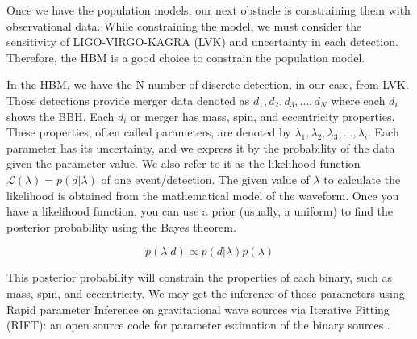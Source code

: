 \documentclass[twocolumn,prd,nofootinbib]{revtex4}
\begin{document}
Once we have the population models, our next obstacle is constraining them with observational data. While constraining the model, we must consider the sensitivity of LIGO-VIRGO-KAGRA (LVK) and uncertainty in each detection. Therefore, the HBM is a good choice to constrain the population model.

In the HBM, we have the N number of discrete detection, in our case, from LVK. Those detections provide merger data denoted as $d_1,d_2,d_3,...,d_N$ where each $d_i$ shows the BBH. Each $d_i$ or merger has mass, spin, and eccentricity properties. These properties, often called parameters, are denoted by $\lambda_1,\lambda_2,\lambda_3,...,\lambda_i$. Each parameter has its uncertainty, and we express it by the probability of the data given the parameter value. We also refer to it as the likelihood function $\mathcal{L}(\lambda)=p(d|\lambda)$ of one event/detection. The given value of $\lambda$ to calculate the likelihood is obtained from the mathematical model of the waveform. Once you have a likelihood function, you can use a prior (usually, a uniform) to find the posterior probability using the Bayes theorem.

\begin{equation}
\label{eq:Bayes_ind}    
p(\lambda|d) \propto p(d|\lambda) p(\lambda)
\end{equation}

This posterior probability will constrain the properties of each binary, such as mass, spin, and eccentricity. We may get the inference of those parameters using Rapid parameter Inference on gravitational wave sources via Iterative Fitting (RIFT): an open source code for parameter estimation of the binary sources \cite{rift_2018}.



    
\end{document}
